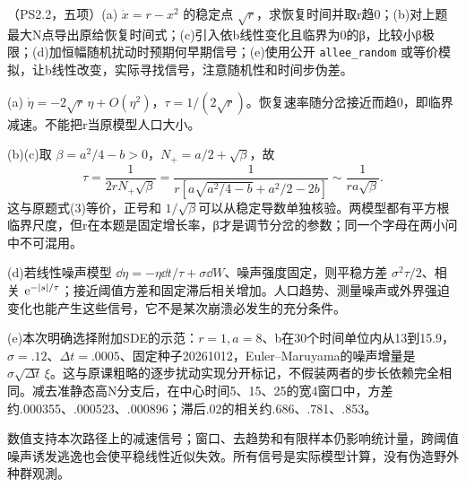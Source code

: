 \begin{exercise}\label{task:chaos-PS2-2}
（PS2.2，五项）(a) $\dot x=r-x^2$ 的稳定点 $\sqrt r$，求恢复时间并取r趋0；(b)对上题最大N点导出原给恢复时间式；(c)引入依b线性变化且临界为0的β，比较小β极限；(d)加恒幅随机扰动时预期何早期信号；(e)使用公开 \texttt{allee\_random} 或等价模拟，让b线性改变，实际寻找信号，注意随机性和时间步伪差。
\end{exercise}
\begin{solution}
(a) $\dot\eta=-2\sqrt r\,\eta+O(\eta^2)$，$\tau=1/(2\sqrt r)$。恢复速率随分岔接近而趋0，即临界减速。不能把r当原模型人口大小。

(b)(c)取 $\beta=a^2/4-b>0$，$N_+=a/2+\sqrt\beta$，故
\[
 \tau=\frac1{2rN_+\sqrt\beta}
 =\frac1{r[a\sqrt{a^2/4-b}+a^2/2-2b]}
 \sim\frac1{ra\sqrt\beta}.
\]
这与原题式(3)等价，正号和 $1/\sqrt\beta$可以从稳定导数单独核验。两模型都有平方根临界尺度，但r在本题是固定增长率，β才是调节分岔的参数；同一个字母在两小问中不可混用。

(d)若线性噪声模型 $\dd\eta=-\eta\dd t/\tau+\sigma\dd W$、噪声强度固定，则平稳方差 $\sigma^2\tau/2$、相关 $\mathrm e^{-|s|/\tau}$；接近阈值方差和固定滞后相关增加。人口趋势、测量噪声或外界强迫变化也能产生这些信号，它不是某次崩溃必发生的充分条件。

(e)本次明确选择附加SDE的示范：$r=1,a=8$、b在30个时间单位内从13到15.9，$\sigma=.12$、$\Delta t=.0005$、固定种子20261012，Euler--Maruyama的噪声增量是 $\sigma\sqrt{\Delta t}\,\xi$。这与原课粗略的逐步扰动实现分开标记，不假装两者的步长依赖完全相同。减去准静态高N分支后，在中心时间5、15、25的宽4窗口中，方差约.000355、.000523、.000896；滞后.02的相关约.686、.781、.853。
\begin{center}\end{center}
数值支持本次路径上的减速信号；窗口、去趋势和有限样本仍影响统计量，跨阈值噪声诱发逃逸也会使平稳线性近似失效。所有信号是实际模型计算，没有伪造野外种群观測。
\end{solution}
